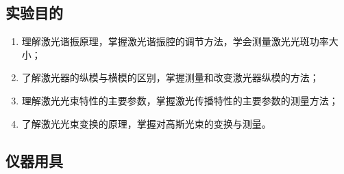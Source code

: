 \documentclass[dvipsnames, svgnames,a4paper,11pt]{article}
\begin{document}
\subsection{实验目的}
\begin{enumerate}
	\item 理解激光谐振原理，掌握激光谐振腔的调节方法，学会测量激光光斑功率大小；
	\item 了解激光器的纵模与横模的区别，掌握测量和改变激光器纵模的方法；
	\item 理解激光光束特性的主要参数，掌握激光传播特性的主要参数的测量方法；
	\item 了解激光光束变换的原理，掌握对高斯光束的变换与测量。
	
\end{enumerate}

\subsection{仪器用具}


		
		
		




\end{document}
